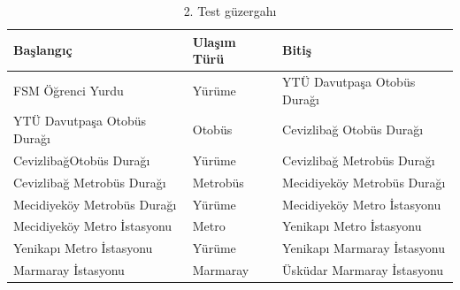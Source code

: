 \begin{table}[!h]
\centering
\caption{2. Test güzergahı}
\label{my-label}
\begin{tabular}{|l|l|l|}
\hline
\textbf{Başlangıç}          & \textbf{Ulaşım Türü} & \textbf{Bitiş}              \\ \hline
FSM Öğrenci Yurdu           & Yürüme               & YTÜ Davutpaşa Otobüs Durağı \\ \hline
YTÜ Davutpaşa Otobüs Durağı & Otobüs               & Cevizlibağ Otobüs Durağı    \\ \hline
CevizlibağOtobüs Durağı     & Yürüme               & Cevizlibağ Metrobüs Durağı  \\ \hline
Cevizlibağ Metrobüs Durağı  & Metrobüs             & Mecidiyeköy Metrobüs Durağı \\ \hline
Mecidiyeköy Metrobüs Durağı & Yürüme               & Mecidiyeköy Metro İstasyonu \\ \hline
Mecidiyeköy Metro İstasyonu & Metro                & Yenikapı Metro İstasyonu    \\ \hline
Yenikapı Metro İstasyonu    & Yürüme               & Yenikapı Marmaray İstasyonu \\ \hline
Marmaray İstasyonu          & Marmaray             & Üsküdar Marmaray İstasyonu  \\ \hline
\end{tabular}
\end{table}


